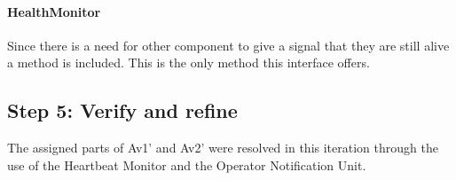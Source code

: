\paragraph{HealthMonitor}
\npar Since there is a need for other component to give a signal that they are
still alive a method  is included. This is the only method this
interface offers.

\subsection{Step 5: Verify and refine}
\label{add:it9/verification}

\npar The assigned parts of Av1' and Av2' were resolved in this iteration
through the use of the Heartbeat Monitor and the Operator Notification Unit.
